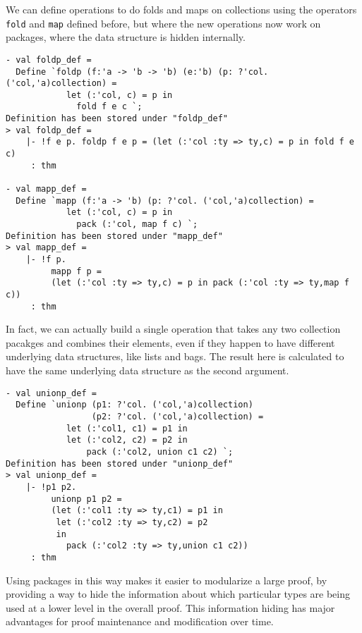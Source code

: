 We can define operations to do folds and maps on collections using the operators
\texttt{fold} and \texttt{map} defined before, but where the new operations now work on
packages, where the data structure is hidden internally.
\begin{session}
\begin{verbatim}
- val foldp_def =
  Define `foldp (f:'a -> 'b -> 'b) (e:'b) (p: ?'col. ('col,'a)collection) =
            let (:'col, c) = p in
              fold f e c `;
Definition has been stored under "foldp_def"
> val foldp_def =
    |- !f e p. foldp f e p = (let (:'col :ty => ty,c) = p in fold f e c)
     : thm

- val mapp_def =
  Define `mapp (f:'a -> 'b) (p: ?'col. ('col,'a)collection) =
            let (:'col, c) = p in
              pack (:'col, map f c) `;
Definition has been stored under "mapp_def"
> val mapp_def =
    |- !f p.
         mapp f p =
         (let (:'col :ty => ty,c) = p in pack (:'col :ty => ty,map f c))
     : thm
\end{verbatim}
\end{session}

In fact, we can actually build a single operation that takes any two collection pacakges
and combines their elements, even if they happen to have different underlying data structures,
like lists and bags.  The result here is calculated to have the same underlying data structure
as the second argument.
\begin{session}
\begin{verbatim}
- val unionp_def =
  Define `unionp (p1: ?'col. ('col,'a)collection)
                 (p2: ?'col. ('col,'a)collection) =
            let (:'col1, c1) = p1 in
            let (:'col2, c2) = p2 in
                pack (:'col2, union c1 c2) `;
Definition has been stored under "unionp_def"
> val unionp_def =
    |- !p1 p2.
         unionp p1 p2 =
         (let (:'col1 :ty => ty,c1) = p1 in
          let (:'col2 :ty => ty,c2) = p2
          in
            pack (:'col2 :ty => ty,union c1 c2))
     : thm
\end{verbatim}
\end{session}

Using packages in this way makes it easier to modularize a large proof, by providing a
way to hide the information about which particular types are being used at a lower level
in the overall proof.  This information hiding has major advantages for proof maintenance
and modification over time.

